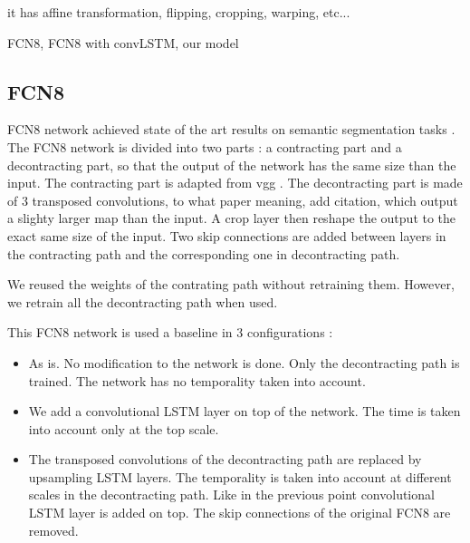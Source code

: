it has affine transformation, flipping, cropping, warping, etc...


FCN8, FCN8 with convLSTM, our model
\subsection{FCN8}
FCN8 network achieved state of the art results on semantic segmentation tasks
\cite{DBLP:conf/cvpr/LongSD15}. The FCN8 network is divided into two parts : a
contracting part and a decontracting part, so that the output of the network
has the same size than the input. The contracting part is adapted from vgg
\cite{Simonyan14vgg}. The decontracting part is made of 3 transposed
convolutions, to what paper meaning, add citation, which output a slighty
larger map than the input. A crop layer then reshape the output to the exact
same size of the input. Two skip connections are added between layers in the
contracting path and the corresponding one in decontracting path.

We reused the weights of the contrating path without retraining them. However,
we retrain all the decontracting path when used.

This FCN8 network is used a baseline in 3 configurations :
\begin{itemize}
    \item As is. No modification to the network is done. Only the decontracting
        path is trained. The network has no temporality taken into account.
    \item We add a convolutional LSTM layer on top of the network. The time is
        taken into account only at the top scale.
    \item The transposed convolutions of the decontracting path are replaced by
        upsampling LSTM layers. The temporality is taken into account at
        different scales in the decontracting path. Like in the previous point
        convolutional LSTM layer is added on top. The skip connections of the
        original FCN8 are removed.
\end{itemize}


